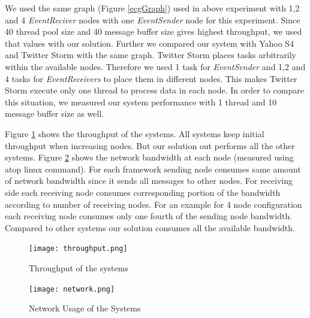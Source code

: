 We used the same graph (Figure \ref{ecgGraph}) used in above experiment with 1,2 and 4 \textit{EventReciver} nodes with one \textit{EventSender} node for this experiment. Since 40 thread pool size and 40 message buffer size gives highest throughput, we used that values with our solution. Further we compared our system with Yahoo S4 and Twitter Storm with the same graph. Twitter Storm places tasks arbitrarily within the available nodes. Therefore we used 1 task for \textit{EventSender} and 1,2 and 4 tasks for \textit{EventReceivers} to place them in different nodes. This makes Twitter Storm execute only one thread to process data in each node. In order to compare this situation, we measured our system performance with 1 thread and 10 message buffer size as well.   

Figure \ref{throuput} shows the throughput of the systems. All systems keep initial throughput when increasing nodes. But our solution out performs all the other systems. Figure \ref{networkusage} shows the network bandwidth at each node (measured using atop linux command). For each framework sending node consumes same amount of network bandwidth since it sends all messages to other nodes. For receiving side each receiving node consumes corresponding portion of the bandwidth according to number of receiving nodes. For an example for 4 node configuration each receiving node consumes only one fourth of the sending node bandwidth. Compared to other systems our solution consumes all the available bandwidth. 

\begin{figure}[!t]
        \centering
        \texttt{[image: throughput.png]}
        \caption{Throughput of the systems}
        \label{throuput}
\end{figure}

\begin{figure}[!t]
        \centering
        \texttt{[image: network.png]}
        \caption{Network Usage of the Systems}
        \label{networkusage}
\end{figure}



